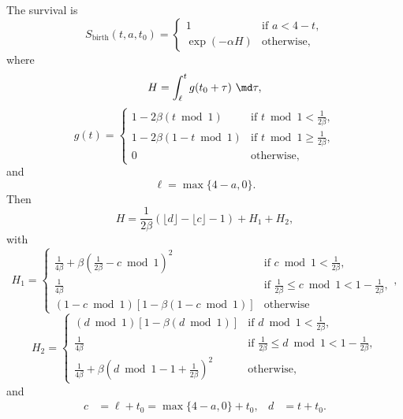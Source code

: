 \documentclass{jpmarticle}
\begin{document}
The survival is
\begin{equation}
  S_{\text{birth}}(t, a, t_0) =
  \begin{cases}
    1 & \text{if $a < 4 - t$},
    \\
    \exp(-\alpha H) & \text{otherwise},
  \end{cases}
\end{equation}
where
\begin{equation}
  H = \int_{\ell}^t g(t_0 + \tau)~\md \tau,
\end{equation}
\begin{equation}
  g (t) =
  \begin{cases}
    1 - 2 \beta (t \bmod 1)
    & \text{if $t \bmod 1 < \frac{1}{2 \beta}$},
    \\
    1 - 2 \beta (1 - t \bmod 1)
    & \text{if $t \bmod 1 \geq \frac{1}{2 \beta}$},
    \\
    0 & \text{otherwise},
  \end{cases}
\end{equation}
and
\begin{equation}
  \ell = \max\{4 - a, 0\}.
\end{equation}
Then
\begin{equation}
  H = \frac{1}{2 \beta} \left(\lfloor d \rfloor - \lfloor c \rfloor -
    1\right) + H_1 + H_2,
\end{equation}
with
\begin{equation}
  H_1 =
  \begin{cases}
    \frac{1}{4 \beta} + \beta \left(\frac{1}{2 \beta}
      - c \bmod 1\right)^2
    & \text{if $c \bmod 1 < \frac{1}{2 \beta}$},
    \\
    \frac{1}{4 \beta}
    & \text{if $\frac{1}{2 \beta} \leq c \bmod 1
      < 1 - \frac{1}{2 \beta}$},
    \\
    \left(1 - c \bmod 1\right) \left[1 -
      \beta \left(1 - c \bmod 1\right)\right]
    & \text{otherwise}
  \end{cases},
\end{equation}
\begin{equation}
  H_2 =
  \begin{cases}
    (d \bmod 1) \left[1 - \beta (d \bmod 1)\right]
    & \text{if $d \bmod 1 < \frac{1}{2 \beta}$},
    \\
    \frac{1}{4 \beta}
    & \text{if $\frac{1}{2 \beta} \leq d \bmod 1 <
      1 - \frac{1}{2 \beta}$},
    \\
    \frac{1}{4 \beta} + \beta \left(d \bmod 1 - 1
      + \frac{1}{2 \beta}\right)^2
    & \text{otherwise},
  \end{cases}
\end{equation}
and
\begin{align}
  c &= \ell + t_0 = \max\{4 - a, 0\} + t_0,
  &
  d &= t + t_0.
\end{align}
\end{document}
